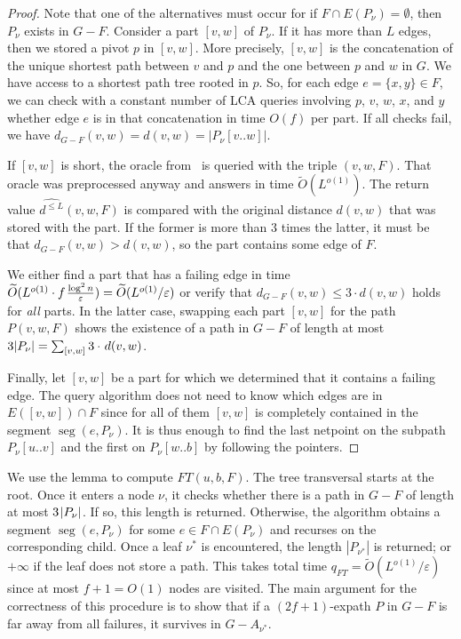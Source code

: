 \documentclass{theoretics}
\DeclareMathOperator{\seg}{seg}
\newcommand*{\Otilde}{\widetilde{O}}
\newcommand*{\length}[1]{|#1|}
\newcommand*{\nwspace}{\hspace*{.1em}}
\renewcommand{\le}{\leqslant}
\newcommand{\eps}{\varepsilon}
\begin{document}
\begin{proof}
  Note that one of the alternatives must occur
  for if $F \cap E(P_{\nu}) = \emptyset$, then $P_{\nu}$ exists in $G{-}F$.
%
  Consider a part $[v,w]$ of $P_{\nu}$.
  If it has more than $L$ edges,
  then we stored a pivot $p$ in $[v,w]$.
  More precisely, $[v,w]$ is the concatenation of the unique shortest path between $v$ and $p$
  and the one between $p$ and $w$ in $G$.
  We have access to a shortest path tree rooted in $p$.
  So, for each edge $e = \{x,y\} \in F$,
  we can check with a constant number of LCA queries involving $p$, $v$, $w$, $x$, and $y$
  whether edge $e$ is in that concatenation
  in time $O(f)$ per part.
  If all checks fail, we have $d_{G-F}(v,w) = d(v,w) = \length{P_{\nu}[v..w]}$.

  If $[v,w]$ is short, 
  the oracle from~ is queried with the triple $(v,w,F)$.
  That oracle was preprocessed anyway and answers in time $\Otilde(L^{o(1)})$.
  The return value $\widehat{d^{\le L}}(v,w,F)$ is compared with the original distance $d(v,w)$
  that was stored with the part.
  If the former is more than $3$ times the latter, it must be that $d_{G-F}(v,w) > d(v,w)$,
  so the part contains some edge of $F$.

  We either find a part that has a failing edge in time 
  $\Otilde(L^{o(1)} \cdot f \nwspace \frac{\log^2 n}{\eps})
    = \Otilde(L^{o(1)}/{\eps})$
  or verify that $d_{G-F}(v,w) \le 3 \cdot d(v,w)$ holds for \emph{all} parts.
  In the latter case, swapping each part $[v,w]$ for the path $P(v,w,F)$
  shows the existence of a path in $G{-}F$ of length at most $3 \length{P_{\nu}} =  \sum_{[v,w]} 3 \cdot \nwspace d(v,w)$.

  Finally, let $[v,w]$ be a part for which we determined that it contains a failing edge.
  The query algorithm does not need to know which edges are in $E([v,w]) \cap F$
  since for all of them $[v,w]$ is completely contained in the segment $\seg(e,P_{\nu})$.
  It is thus enough to find the last netpoint on the subpath $P_{\nu}[u..v]$ and 
  the first on $P_{\nu}[w..b]$ by following the pointers.
\end{proof}

We use the lemma to compute $FT(u,b,F)$.
The tree transversal starts at the root.
Once it enters a node $\nu$,
it checks whether there is a path in $G{-}F$
of length at most $3 \nwspace \length{P_{\nu}}$.
If so, this length is returned.
%
Otherwise, the algorithm obtains a segment $\seg(e,P_{\nu})$ for some $e \in F \cap E(P_{\nu})$
and recurses on the corresponding child.
Once a leaf $\nu^*$ is encountered, the length $\length{P_{\nu^*}}$ is returned;
or $+\infty$ if the leaf does not store a path.
This takes total time $q_{FT} = \Otilde(L^{o(1)}/\varepsilon)$
since at most $f{+}1 = O(1)$ nodes are visited.
The main argument for the correctness of this procedure 
is to show that if a $(2f{+}1)$-expath $P$
in $G{-}F$ is far away from all failures,
it survives in $G{-}A_{\nu^*}$.
\end{document}
